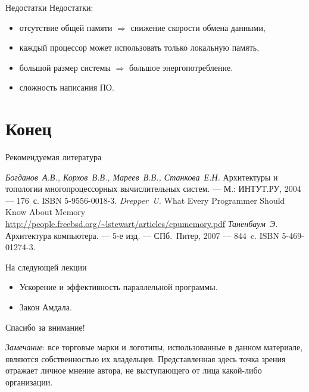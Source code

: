 \begin{frame}{Недостатки}
Недостатки:
\begin{itemize}
    \item отсутствие общей памяти $\Rightarrow$ снижение скорости обмена данными,
    \item каждый процессор может использовать только локальную память,
    \item большой размер системы $\Rightarrow$ большое энергопотребление.
    \item сложность написания ПО.
\end{itemize}
\end{frame}

\section*{Конец}

\begin{frame}[allowframebreaks]{Рекомендуемая литература}
\begin{thebibliography}{99}
    \bibitem{} \textit{Богданов~А.В., Корхов~В.В., Мареев~В.В., Станкова~Е.Н.}
    Архитектуры и топологии многопроцессорных вычислительных систем. --- М.:
    ИНТУТ.РУ, 2004 --- 176~с. ISBN 5-9556-0018-3.
    \bibitem{} \textit{Drepper~U.} What Every Programmer Should Know About Memory
    \url{http://people.freebsd.org/~lstewart/articles/cpumemory.pdf}
    \bibitem{} \textit{Таненбаум~Э.} Архитектура компьютера. --- 5-е изд. ---
        СПб.~Питер, 2007 --- 844~c. ISBN 5-469-01274-3.
\end{thebibliography}
\end{frame}

\begin{frame}{На следующей лекции}
\begin{itemize}
    \item Ускорение и эффективность параллельной программы.
    \item Закон Амдала.
\end{itemize}
\end{frame}

\begin{frame}

{\huge{Спасибо за внимание!}\par}

\vfill

\tiny{\textit{Замечание}: все торговые марки и логотипы, использованные в данном материале, являются собственностью их владельцев. Представленная здесь точка зрения отражает личное мнение автора, не выступающего от лица какой-либо организации.}

\end{frame}


